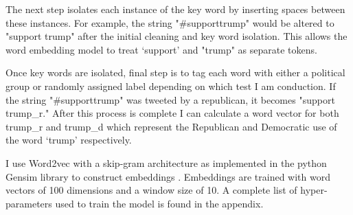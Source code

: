 \documentclass[../embeddings.tex]{subfiles}
\begin{document}
The next step isolates each instance of the key word by inserting spaces between these instances. For example, the string "\#supporttrump" would be altered to "support trump" after the initial cleaning and key word isolation. This allows the word embedding model to treat ‘support’ and "trump" as separate tokens. 

Once key words are isolated, final step is to tag each word with either a political group or randomly assigned label depending on which test I am conduction. If the string "\#supporttrump" was tweeted by a republican, it becomes "support trump\_r." After this process is complete I can calculate a word vector for both trump\_r and trump\_d which represent the Republican and Democratic use of the word ‘trump’ respectively.	

I use Word2vec with a skip-gram architecture as implemented in the python Gensim library to construct embeddings \cite{rehurek_lrec}. Embeddings are trained with word vectors of 100 dimensions and a window size of 10. A complete list of hyper-parameters used to train the model is found in the appendix.
\end{document}
